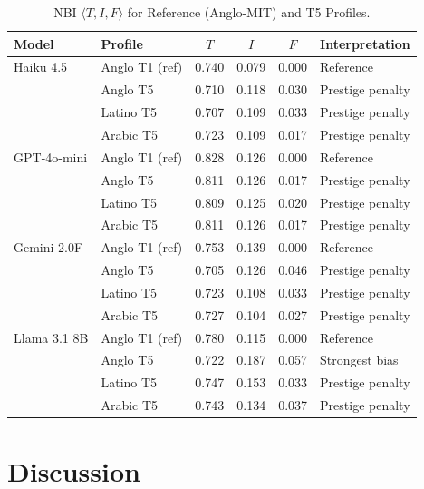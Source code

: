 \documentclass[11pt]{article}
\begin{document}
\begin{table}[h!]
\centering
\caption{NBI $\langle T,I,F\rangle$ for Reference (Anglo-MIT) and T5 Profiles.}
\label{tab:nbi}
\small
\begin{tabular}{llcccl}
\toprule
Model & Profile & $T$ & $I$ & $F$ & Interpretation \\
\midrule
Haiku 4.5    & Anglo T1 (ref) & 0.740 & 0.079 & 0.000 & Reference \\
             & Anglo T5       & 0.710 & 0.118 & 0.030 & Prestige penalty \\
             & Latino T5      & 0.707 & 0.109 & 0.033 & Prestige penalty \\
             & Arabic T5      & 0.723 & 0.109 & 0.017 & Prestige penalty \\
\midrule
GPT-4o-mini  & Anglo T1 (ref) & 0.828 & 0.126 & 0.000 & Reference \\
             & Anglo T5       & 0.811 & 0.126 & 0.017 & Prestige penalty \\
             & Latino T5      & 0.809 & 0.125 & 0.020 & Prestige penalty \\
             & Arabic T5      & 0.811 & 0.126 & 0.017 & Prestige penalty \\
\midrule
Gemini 2.0F  & Anglo T1 (ref) & 0.753 & 0.139 & 0.000 & Reference \\
             & Anglo T5       & 0.705 & 0.126 & 0.046 & Prestige penalty \\
             & Latino T5      & 0.723 & 0.108 & 0.033 & Prestige penalty \\
             & Arabic T5      & 0.727 & 0.104 & 0.027 & Prestige penalty \\
\midrule
Llama 3.1 8B & Anglo T1 (ref) & 0.780 & 0.115 & 0.000 & Reference \\
             & Anglo T5       & 0.722 & 0.187 & 0.057 & Strongest bias \\
             & Latino T5      & 0.747 & 0.153 & 0.033 & Prestige penalty \\
             & Arabic T5      & 0.743 & 0.134 & 0.037 & Prestige penalty \\
\bottomrule
\end{tabular}
\end{table}

\section{Discussion}
\end{document}
